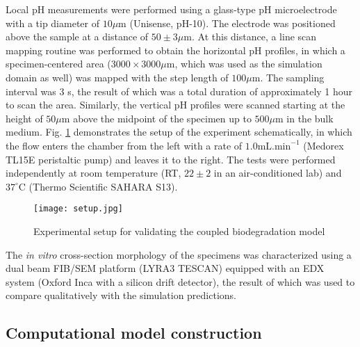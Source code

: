 
Local pH measurements were performed using a glass-type pH microelectrode with a tip diameter of $10\mu\text{m}$ (Unisense, pH-10). The electrode was positioned above the sample at a distance of $50\pm3\mu\text{m}$. At this distance, a line scan mapping routine was performed to obtain the horizontal pH profiles, in which a specimen-centered area ($3000 \times 3000 \mu\text{m}$, which was used as the simulation domain as well) was mapped with the step length of $100\mu\text{m}$. The sampling interval was 3 s, the result of which was a total duration of approximately 1 hour to scan the area. Similarly, the vertical pH profiles were scanned starting at the height of $50\mu\text{m}$ above the midpoint of the specimen up to $500\mu\text{m}$ in the bulk medium. Fig. \ref{fig:kinetics_setup} demonstrates the setup of the experiment schematically, in which the flow enters the chamber from the left with a rate of $1.0\text{mL.min}^{-1}$ (Medorex TL15E peristaltic pump) and leaves it to the right. The tests were performed independently at room temperature (\gls{RT}, $22 \pm 2$ in an air-conditioned lab) and $37^{\circ}\text{C}$ (Thermo Scientific SAHARA S13).


\begin{figure}[h]
\centering
\medskip
\texttt{[image: setup.jpg]}
\caption[Experimental setup for validating the coupled biodegradation model]{Experimental setup for validating the coupled biodegradation model} \label{fig:kinetics_setup}
\end{figure}


The \textit{in vitro} cross-section morphology of the specimens was characterized using a dual beam \gls{FIB}/\gls{SEM} platform (LYRA3 TESCAN) equipped with an \gls{EDX} system (Oxford Inca with a silicon drift detector), the result of which was used to compare qualitatively with the simulation predictions.

\subsection{Computational model construction}

